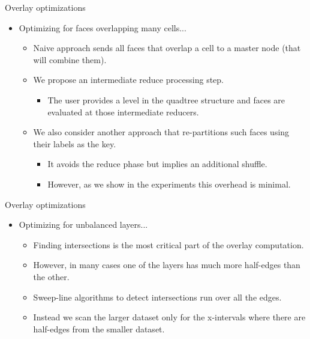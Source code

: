     \begin{frame}{Overlay optimizations}
        \begin{itemize}
            \item Optimizing for faces overlapping many cells...
                \begin{itemize}
                    \item Naive approach sends all faces that overlap a cell to a master node (that will combine them).
                    \item We propose an intermediate reduce processing step.
                    \begin{itemize}
                    \item The user provides a level in the quadtree structure and faces are evaluated at those intermediate reducers.
                   \end{itemize}
                   \item We also consider another approach that re-partitions such faces using their labels as the key.
                    \begin{itemize}
                    \item It avoids the reduce phase but implies an additional shuffle.
                    \item However, as we show in the experiments this overhead is minimal.
                    \end{itemize}
                \end{itemize}
        \end{itemize}
    \end{frame}

    \begin{frame}{Overlay optimizations}
        \begin{itemize}
            \item Optimizing for unbalanced layers...
                \begin{itemize}
                    \item Finding intersections is the most critical part of the overlay computation.
                    \item However, in many cases one of the layers has much more half-edges than the other.
                    \item Sweep-line algorithms to detect intersections run over all the edges.
                    \item Instead we scan the larger dataset only for the x-intervals where there are half-edges from the smaller dataset.
                \end{itemize}
        \end{itemize}
    \end{frame}

